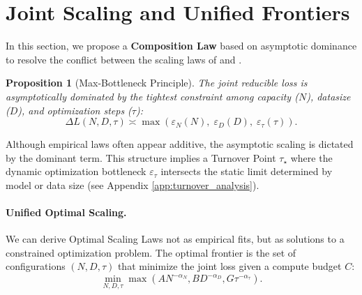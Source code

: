 \documentclass{article}
\theoremstyle{plain}
\newtheorem{proposition}[theorem]{Proposition}
\theoremstyle{definition}
\theoremstyle{remark}
\begin{document}
\section{Joint Scaling and Unified Frontiers}\label{sec:joint_scaling}

In this section, we propose a \textbf{Composition Law} based on asymptotic dominance to resolve the conflict between the scaling laws of \citet{kaplan2020scalinglawsneurallanguage} and \citet{hoffmann2022trainingcomputeoptimallargelanguage}.

\begin{proposition}[Max-Bottleneck Principle]
\label{prop:max_bottleneck}
The joint reducible loss is asymptotically dominated by the tightest constraint among capacity ($N$), datasize ($D$), and optimization steps ($\tau$):
\begin{equation*}
    \label{eq:max_structure}
    \Delta L(N, D, \tau) \asymp \max\left( \varepsilon_N(N), \; \varepsilon_D(D), \; \varepsilon_\tau(\tau) \right).
\end{equation*}
\end{proposition}
Although empirical laws often appear additive, the asymptotic scaling is dictated by the dominant term. This structure implies a Turnover Point $\tau_\star$ where the dynamic optimization bottleneck $\varepsilon_\tau$ intersects the static limit determined by model or data size (see Appendix \ref{app:turnover_analysis}).


\paragraph{Unified Optimal Scaling.}

We can derive Optimal Scaling Laws not as empirical fits, but as solutions to a constrained optimization problem. The optimal frontier is the set of configurations $(N, D, \tau)$ that minimize the joint loss given a compute budget $C$:
\begin{equation}
    \min_{N, D, \tau} \max \left( A N^{-\alpha_N}, B D^{-\alpha_D}, G \tau^{-\alpha_\tau} \right).
    \label{eq:joint_optimization}
\end{equation}
\end{document}
